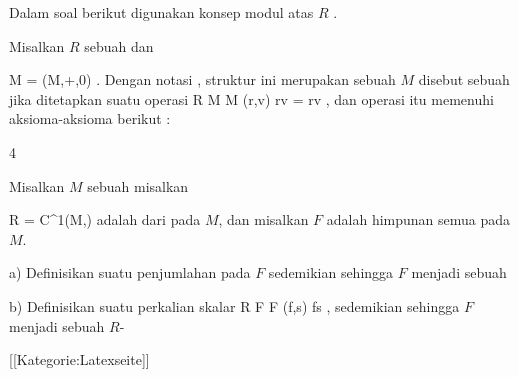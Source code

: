 Dalam soal berikut digunakan konsep modul atas $R$
 {} {.}

Misalkan $R$ sebuah
dan

\mavergleichskette
{\vergleichskette
{ M
}
{ = }{ (M,+,0)
}
{  }{
}
{    }{
}
{   }{
}
}
{}{}{}.
Dengan notasi  {}, struktur ini merupakan sebuah
$M$ disebut sebuah
jika ditetapkan suatu operasi
\maabbeledisp {} {R \times M } { M
} {(r,v)} { rv = r\cdot v
} {,}
 {} {}
dan operasi itu memenuhi aksioma-aksioma berikut
 {} {:}

{4}
{

Misalkan $M$ sebuah
misalkan

\mavergleichskette
{\vergleichskette
{ R
}
{ = }{ C^1(M,\R)
}
{  }{
}
{    }{
}
{   }{
}
}
{}{}{}
adalah
dari
pada $M$, dan misalkan $F$ adalah himpunan semua
pada $M$.

a) Definisikan suatu penjumlahan pada $F$ sedemikian sehingga $F$ menjadi sebuah

b) Definisikan suatu perkalian skalar
\maabbeledisp {} {R \times F } { F
} {(f,s)} {fs
} {,}
sedemikian sehingga $F$ menjadi sebuah
$R$-

}
{} {}

 [[Kategorie:Latexseite]]
